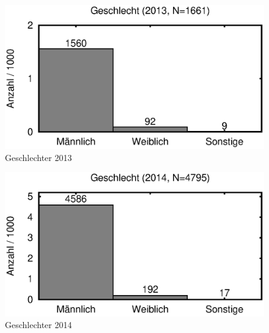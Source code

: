 \documentclass[11pt]{scrartcl}
\begin{document}
\begin{figure}[htbp]
   \centering
   \includegraphics{2013/geschlecht-abs}
   \caption{Geschlechter 2013}
   \label{fig:2013-geschlecht}
\end{figure}

\begin{figure}[htbp]
   \centering
   \includegraphics{2014/geschlecht-abs}
   \caption{Geschlechter 2014}
   \label{fig:2014-geschlecht}
\end{figure}

\clearpage
{}

\end{document}

